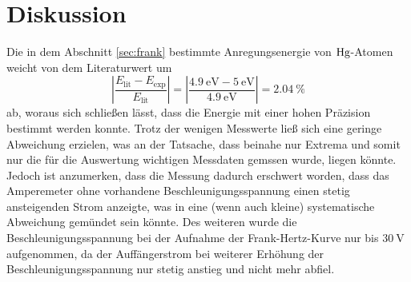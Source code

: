 \section{Diskussion}
\label{sec:Diskussion}
Die in dem Abschnitt \ref{sec:frank} bestimmte Anregungsenergie von $\ce{Hg}$-Atomen weicht von dem Literaturwert\cite{lit} um
\begin{equation*}
   \left | \frac{E_\text{lit} - E_\text{exp}}{E_\text{lit}} \right | = \left | \frac{\SI{4.9}{\electronvolt}-\SI{5}{\electronvolt} }{\SI{4.9}{\electronvolt}} \right |
    = \SI{2.04}{\percent}
\end{equation*} 
ab, woraus sich schließen lässt, dass die Energie mit einer hohen Präzision bestimmt werden konnte.
Trotz der wenigen Messwerte ließ sich eine geringe Abweichung erzielen, was an der Tatsache, dass beinahe nur Extrema und somit nur die für die 
Auswertung wichtigen Messdaten gemssen wurde, liegen könnte.
Jedoch ist anzumerken, dass die Messung dadurch erschwert worden, dass das Amperemeter ohne vorhandene Beschleunigungsspannung einen stetig ansteigenden 
Strom anzeigte, was in eine (wenn auch kleine) systematische Abweichung gemündet sein könnte.
Des weiteren wurde die Beschleunigungsspannung bei der Aufnahme der Frank-Hertz-Kurve nur bis $\SI{30}{\volt}$ aufgenommen, da der Auffängerstrom bei 
weiterer Erhöhung der Beschleunigungsspannung nur stetig anstieg und nicht mehr abfiel. 
